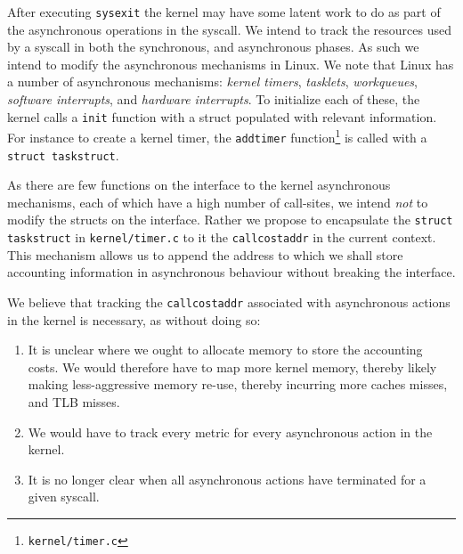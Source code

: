 \documentclass[12pt]{article}
\def\_{\textunderscore\-}
\begin{document}
  After executing \texttt{sysexit} the kernel may have some latent work to do as part of the asynchronous operations in the syscall. We intend to track the resources used by a syscall in both the synchronous, and asynchronous phases. As such we intend to modify the asynchronous mechanisms in Linux.  We note that Linux has a number of asynchronous mechanisms: \emph{kernel timers}, \emph{tasklets}, \emph{workqueues}, \emph{software interrupts}, and \emph{hardware interrupts}. To initialize each of these, the kernel calls a \texttt{\_\_init} function with a struct populated with relevant information. For instance to create a kernel timer, the \texttt{add\_timer} function\footnote{\texttt{kernel/timer.c}} is called with a \texttt{struct task\_struct}.

  As there are few functions on the interface to the kernel asynchronous mechanisms, each of which have a high number of call-sites, we intend \emph{not} to modify the structs on the interface.
  Rather we propose to encapsulate the \texttt{struct task\_struct} in \texttt{kernel/timer.c} to it the \texttt{call\_cost\_addr} in the current context.
  This mechanism allows us to append the address to which we shall store accounting information in asynchronous behaviour without breaking the interface.

  We believe that tracking the \texttt{call\_cost\_addr} associated with asynchronous actions in the kernel is necessary, as without doing so:
  \begin{enumerate}
  \item It is unclear where we ought to allocate memory to store the accounting costs. We would therefore have to map more kernel memory, thereby likely making less-aggressive memory re-use, thereby incurring more caches misses, and TLB misses.
  \item We would have to track every metric for every asynchronous action in the kernel.
  \item It is no longer clear when all asynchronous actions have terminated for a given syscall.
  \end{enumerate}
\end{document}
